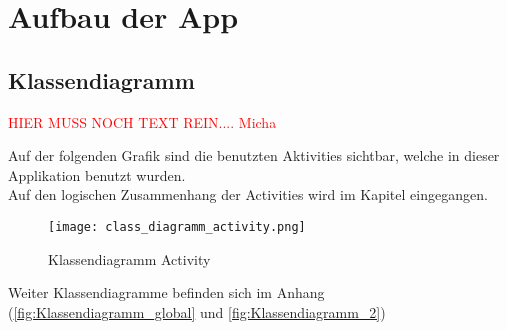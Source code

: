 \newpage
\section{Aufbau der App}

\subsection{Klassendiagramm}  

\textcolor{red}{HIER MUSS NOCH TEXT REIN.... Micha}

Auf der folgenden Grafik sind die benutzten Aktivities sichtbar, welche in dieser Applikation benutzt wurden.\\
Auf den logischen Zusammenhang der Activities wird im Kapitel  eingegangen. \\

\begin{figure}[h!]
\label{fig:class_diagramm_activity}
\centering
\texttt{[image: class\_diagramm\_activity.png]} 
\caption{Klassendiagramm Activity}
\end{figure}

Weiter Klassendiagramme befinden sich im Anhang (\ref{fig:Klassendiagramm_global} und \ref{fig:Klassendiagramm_2})